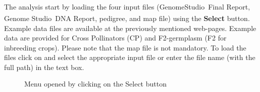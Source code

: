 \documentclass[a4paper,11pt,english]{article}
\newcommand{\reg}{\textsuperscript{\textregistered}}
\begin{document}
The analysis start by loading the four input files (GenomeStudio\reg~Final Report,
Genome Studio\reg~DNA Report, pedigree, and map file) using the \textbf{Select} button. Example data
files are available at the previously mentioned web-pages. Example data are provided for Cross
Pollinators (CP) and  F2-germplasm (F2 for inbreeding crops). Please note
that the map file is not mandatory. To load the files
click on  and select the appropriate input file 
or enter the file name (with the full path)
in the text box.
\begin{figure}[H]
\centering
\capstart

\caption{Menu opened by clicking on the Select button}\end{figure}
\end{document}
